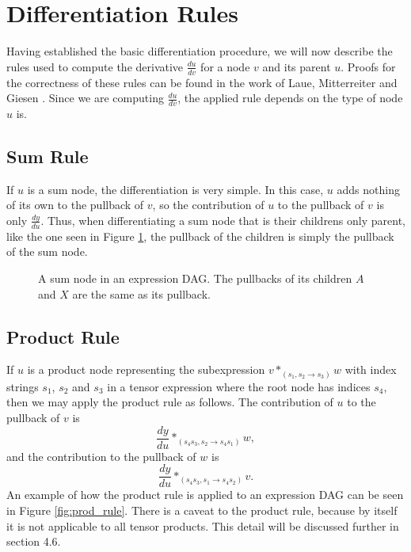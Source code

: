 \documentclass[12pt, a4paper]{report}
\begin{document}
\section{Differentiation Rules}
Having established the basic differentiation procedure, we will now describe the rules used to compute the derivative $\frac{du}{dv}$ for a node $v$ and its parent $u$.
Proofs for the correctness of these rules can be found in the work of Laue, Mitterreiter and Giesen \cite{tensorpaper}.
Since we are computing $\frac{du}{dv}$, the applied rule depends on the type of node $u$ is.

\FloatBarrier
\subsection{Sum Rule}
If $u$ is a sum node, the differentiation is very simple.
In this case, $u$ adds nothing of its own to the pullback of $v$, so the contribution of $u$ to the pullback of $v$ is only $\frac{dy}{du}$.
Thus, when differentiating a sum node that is their childrens only parent, like the one seen in Figure \ref{fig:sum_rule}, the pullback of the children is simply the pullback of the sum node.

\begin{figure}
    \centering
    \caption{A sum node in an expression DAG. The pullbacks of its children $A$ and $X$ are the same as its pullback.}
    \label{fig:sum_rule}
\end{figure}

\FloatBarrier
\subsection{Product Rule}
If $u$ is a product node representing the subexpression $v *_{(s_1,s_2 \rightarrow s_3)} w$ with index strings $s_1$, $s_2$ and $s_3$ in a tensor expression where the root node has indices $s_4$, then we may apply the product rule as follows.
The contribution of $u$ to the pullback of $v$ is 
$$
\frac{dy}{du} *_{(s_4s_3,s_2 \rightarrow s_4s_1)} w,
$$
and the contribution to the pullback of $w$ is 
$$
\frac{dy}{du} *_{(s_4s_3,s_1 \rightarrow s_4s_2)} v.
$$
An example of how the product rule is applied to an expression DAG can be seen in Figure \ref{fig:prod_rule}.
There is a caveat to the product rule, because by itself it is not applicable to all tensor products.
This detail will be discussed further in section 4.6.
\end{document}
